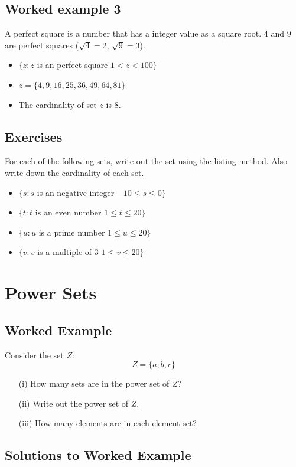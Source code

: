 \documentclass[]{report}
\begin{document}
\subsection*{Worked example 3}
A perfect square is a number that has a integer value as a
square root. 4 and 9 are perfect squares ($\sqrt{4} = 2$,
$\sqrt{9} = 3$).
\begin{itemize}
\item $\{ z : z $ is an perfect square $ 1 < z < 100 \}$
\item $z = \{4,9,16,25,36,49,64,81\}$
\item The cardinality of set $z$ is 8.
\end{itemize}

\newpage

\subsection*{Exercises}
For each of the following sets, write out the set using the listing method.
Also write down the cardinality of each set.

\begin{itemize} 
\item $\{ s : s $ is an negative integer $ -10 \leq s \leq 0 \}$
\item $\{ t : t $ is an even number $ 1 \leq t \leq 20 \}$
\item $\{ u : u $ is a prime number $ 1 \leq u \leq 20 \}$
\item $\{ v : v $ is a multiple of 3 $ 1 \leq v \leq 20 \}$
\end{itemize}
\newpage
\section*{Power Sets}
\subsection*{Worked Example}
Consider the set $Z$:
\[ Z = \{ a,b,c\}  \]
\begin{itemize}
\item[(i)] How many sets are in the power set of $Z$? 
\item[(ii)] Write out the power set of $Z$. 
\item[(iii)] How many elements are in each element set?
\end{itemize}
\subsection*{Solutions to Worked Example}
\end{document}

